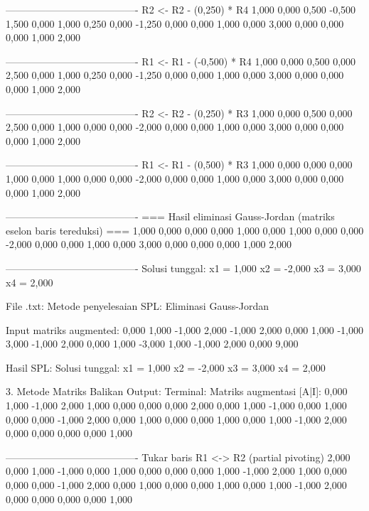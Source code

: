 \documentclass[12pt]{article}
\begin{document}
\begin{enumerate}
\begin{keluaran}
----------------------------------------
R2 <- R2 - (0,250) * R4
1,000   0,000   0,500   -0,500  1,500
0,000   1,000   0,250   0,000   -1,250
0,000   0,000   1,000   0,000   3,000
0,000   0,000   0,000   1,000   2,000

----------------------------------------
R1 <- R1 - (-0,500) * R4
1,000   0,000   0,500   0,000   2,500
0,000   1,000   0,250   0,000   -1,250
0,000   0,000   1,000   0,000   3,000
0,000   0,000   0,000   1,000   2,000

----------------------------------------
R2 <- R2 - (0,250) * R3
1,000   0,000   0,500   0,000   2,500
0,000   1,000   0,000   0,000   -2,000
0,000   0,000   1,000   0,000   3,000
0,000   0,000   0,000   1,000   2,000

----------------------------------------
R1 <- R1 - (0,500) * R3
1,000   0,000   0,000   0,000   1,000
0,000   1,000   0,000   0,000   -2,000
0,000   0,000   1,000   0,000   3,000
0,000   0,000   0,000   1,000   2,000

----------------------------------------
=== Hasil eliminasi Gauss-Jordan (matriks eselon baris tereduksi) ===
1,000   0,000   0,000   0,000   1,000
0,000   1,000   0,000   0,000   -2,000
0,000   0,000   1,000   0,000   3,000
0,000   0,000   0,000   1,000   2,000

----------------------------------------
Solusi tunggal:
x1 = 1,000
x2 = -2,000
x3 = 3,000
x4 = 2,000

File .txt:
Metode penyelesaian SPL: Eliminasi Gauss-Jordan

Input matriks augmented:
0,000	1,000	-1,000	2,000	-1,000
2,000	0,000	1,000	-1,000	3,000
-1,000	2,000	0,000	1,000	-3,000
1,000	-1,000	2,000	0,000	9,000

Hasil SPL:
Solusi tunggal:
x1 = 1,000
x2 = -2,000
x3 = 3,000
x4 = 2,000

3. Metode Matriks Balikan
Output:
Terminal:
Matriks augmentasi [A|I]:
0,000   1,000   -1,000  2,000   1,000   0,000   0,000   0,000
2,000   0,000   1,000   -1,000  0,000   1,000   0,000   0,000
-1,000  2,000   0,000   1,000   0,000   0,000   1,000   0,000
1,000   -1,000  2,000   0,000   0,000   0,000   0,000   1,000

----------------------------------------
Tukar baris R1 <-> R2 (partial pivoting)
2,000   0,000   1,000   -1,000  0,000   1,000   0,000   0,000
0,000   1,000   -1,000  2,000   1,000   0,000   0,000   0,000
-1,000  2,000   0,000   1,000   0,000   0,000   1,000   0,000
1,000   -1,000  2,000   0,000   0,000   0,000   0,000   1,000


\end{keluaran}
\end{enumerate}
\end{document}
